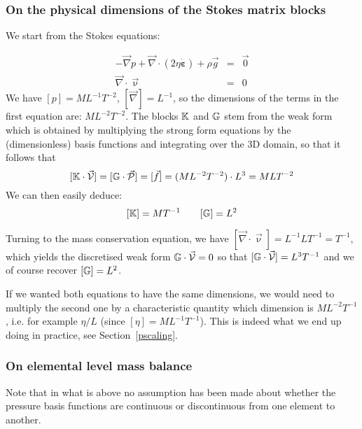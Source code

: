 \subsubsection{On the physical dimensions of the Stokes matrix blocks}
We start from the Stokes equations:

\begin{eqnarray}
- {\vec \nabla p} + {\vec \nabla} \cdot (2 \eta \dot{\bm \varepsilon} ) + \rho \vec{g} &=& \vec{0}  \\
\vec \nabla \cdot \vec \upnu &=& 0 
\end{eqnarray}
We have
$[p]=ML^{-1}T^{-2}$, $[\vec\nabla]=L^{-1}$, so the dimensions of the terms in the first equation 
are: $ML^{-2}T^{-2}$. The blocks ${\mathbb{K}}$ and ${\mathbb{G}}$
stem from the weak form which is obtained by multiplying the strong form equations by the (dimensionless)
basis functions and integrating over the 3D domain, so that it follows that 
\[
[ {\mathbb{K}} \cdot \vec {\cal V}] = [{\mathbb{G}} \cdot \vec {\cal P}] = [\vec f] = (ML^{-2}T^{-2}) \cdot  L^3 = MLT^{-2} 
\]
We can then easily deduce:
\[
[{\mathbb{K}}]=MT^{-1}
\quad
\quad
[{\mathbb{G}}]=L^2
\]

Turning to the mass conservation equation, we have $[\vec \nabla \cdot \vec \upnu]=L^{-1}LT^{-1}=T^{-1}$, 
which yields the discretised weak form ${\mathbb{G}} \cdot \vec{\cal V}=0$ so that $[{\mathbb{G}} \cdot \vec{\cal V}]=L^3 T^{-1}$ and
we of course recover $[{\mathbb{G}}]=L^2$.

If we wanted both equations to have the same dimensions, we would need to multiply the second one by a 
characteristic quantity which dimension is $M L^{-2} T^{-1}$, i.e. for example $\eta/L$ (since $[\eta]=ML^{-1}T^{-1}$).
This is indeed what we end up doing in practice, see Section~\ref{pscaling}.
   

\subsubsection{On elemental level mass balance}
Note that in what is above no assumption has been made about whether 
the pressure basis functions are continuous or discontinuous from one 
element to another. 

